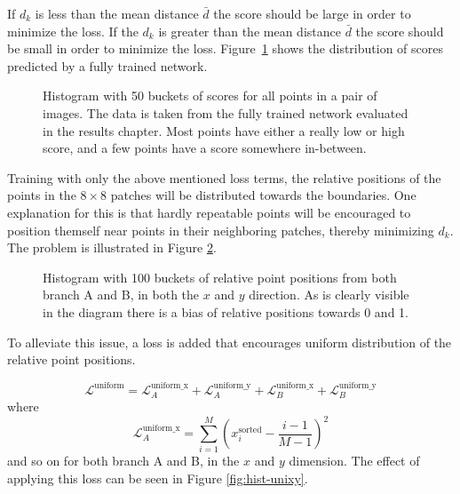 If $d_k$ is less than the mean distance $\bar{d}$ the score should be large in order to minimize the loss. If the $d_k$ is greater than the mean distance $\bar{d}$ the score should be small in order to minimize the loss. Figure~\ref{fig:score-hist} shows the distribution of scores predicted by a fully trained network.

\begin{figure}[H]
	\begin{center}
		
	\end{center}
	\caption{Histogram with 50 buckets of scores for all points in a pair of images. The data is taken from the fully trained network evaluated in the results chapter. Most points have either a really low or high score, and a few points have a score somewhere in-between.}
	\label{fig:score-hist}
\end{figure}

Training with only the above mentioned loss terms, the relative positions of the points in the $8\times 8$ patches will be distributed towards the boundaries. One explanation for this is that hardly repeatable points will be encouraged to position themself near points in their neighboring patches, thereby minimizing $d_k$. The problem is illustrated in Figure \ref{fig:hist-no-unixy}.

\begin{figure}[H]
	\begin{center}
		
	\end{center}
	\caption{Histogram with 100 buckets of relative point positions from both branch A and B, in both the $x$ and $y$ direction. As is clearly visible in the diagram there is a bias of relative positions towards 0 and 1.}
	\label{fig:hist-no-unixy}
\end{figure}

To alleviate this issue, a loss is added that encourages uniform distribution of the relative point positions.


\begin{equation}
\mathcal{L}^{\textrm{uniform}}=\mathcal{L}^{\textrm{uniform\_x}}_A+\mathcal{L}^{\textrm{uniform\_y}}_A+\mathcal{L}^{\textrm{uniform\_x}}_B+\mathcal{L}^{\textrm{uniform\_y}}_B
\end{equation}
where
\begin{equation}
\mathcal{L}^{\textrm{uniform\_x}}_A=\sum_{i=1}^M\left(x_i^{\textrm{sorted}}-\frac{i-1}{M-1}\right)^2
\end{equation}
and so on for both branch A and B, in the $x$ and $y$ dimension. The effect of applying this loss can be seen in Figure \ref{fig:hist-unixy}.

